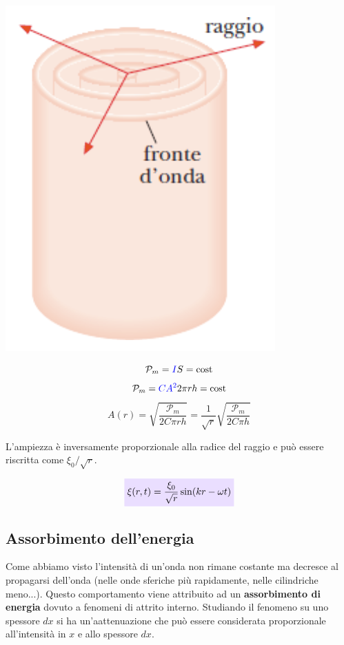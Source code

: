 \documentclass[x11names]{report}
\newcommand{\viola}[1]{\colorbox{yred}{$\displaystyle #1$}}
\begin{document}
		\begin{center}
			\includegraphics[scale=0.30]{imgs/cilindro.png}
		\end{center}

	\[ 
		\mathcal{P}_{m} = \textcolor{blue}{I}S = \text{cost}
	\]
	\[ 
		\mathcal{P}_{m} = \textcolor{blue}{CA^2}2\pi rh = \text{cost}
	\]
	\[ 
	A(r) = \sqrt{\frac{\mathcal{P}_{m}}{2C\pi rh}} = \frac{1}{\sqrt{r}}\sqrt{\frac{\mathcal{P}_{m}}{2C\pi h}}
	\]
	
	L'ampiezza è inversamente proporzionale alla radice del raggio e può essere riscritta come \(\xi_0 /\sqrt{r}\).
	
	\vspace{0.2cm}
	\begin{equation}
		\viola{\xi(r,t) = \frac{\xi_0}{\sqrt{r}}\sin(kr - \omega t)}
	\end{equation}
	
	
	
	\newpage
	\subsection{Assorbimento dell'energia}
	Come abbiamo visto l'intensità di un'onda non rimane costante ma decresce al propagarsi dell'onda (nelle onde sferiche più rapidamente, nelle cilindriche meno...). Questo comportamento viene attribuito ad un \textbf{assorbimento di energia} dovuto a fenomeni di attrito interno. Studiando il fenomeno su uno spessore \(dx\) si ha un'aattenuazione che può essere considerata proporzionale all'intensità in \(x\) e allo spessore \(dx\).
	
\end{document}
